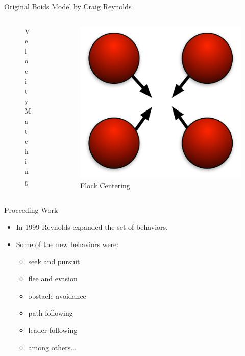 \documentclass[red]{beamer}
\begin{document}
\begin{frame}{Original Boids Model by Craig Reynolds}
\begin{columns}[b]
\begin{column}{4cm}
\begin{figure}[htbp]
\begin{center}
			\caption{Velocity Matching}
			\end{center}
			\end{figure}
		\end{column}
		\pause
		\begin{column}{4cm}
			\begin{figure}[htbp]
			\begin{center}
			\includegraphics[scale=0.1]{../figures/coh_Craig.pdf}
			\caption{Flock Centering}
			\end{center}
			\end{figure}
		\end{column}
	\end{columns}		
\end{frame}


\begin{frame}{Proceeding Work}
	\begin{itemize}
		\pause \item In 1999 Reynolds expanded the set of behaviors.
		\pause \item Some of the new behaviors were:
			\begin{itemize}
				\pause \item seek and pursuit
				\pause \item flee and evasion
				\pause \item obstacle avoidance
				\pause \item path following
				\pause \item leader following
				\pause \item among others...
			\end{itemize}
	\end{itemize}
\end{frame}
		
\end{document}
